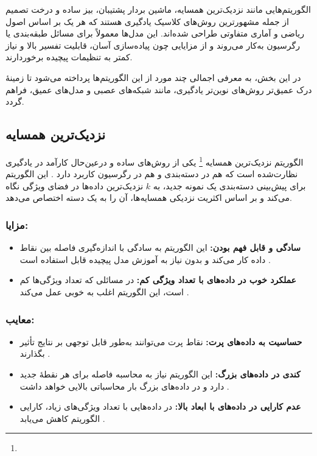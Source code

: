 الگوریتم‌هایی مانند نزدیک‌ترین همسایه، ماشین بردار پشتیبان، بیز ساده و درخت تصمیم از جمله مشهورترین روش‌های کلاسیک یادگیری هستند که هر یک بر اساس اصول ریاضی و آماری متفاوتی طراحی شده‌اند. این مدل‌ها معمولاً برای مسائل طبقه‌بندی یا رگرسیون به‌کار می‌روند و از مزایایی چون پیاده‌سازی آسان، قابلیت تفسیر بالا و نیاز کمتر به تنظیمات پیچیده برخوردارند.

در این بخش، به معرفی اجمالی چند مورد از این الگوریتم‌ها پرداخته می‌شود تا زمینهٔ درک عمیق‌تر روش‌های نوین‌تر یادگیری، مانند شبکه‌های عصبی و مدل‌های عمیق، فراهم گردد.

\subsection{نزدیک‌ترین همسایه }

الگوریتم نزدیک‌ترین همسایه \footnote{} یکی از روش‌های ساده و درعین‌حال کارآمد در یادگیری نظارت‌شده است که هم در دسته‌بندی و هم در رگرسیون کاربرد دارد
\cite{cover1967nearest,duda1973pattern,mitchell1997machine}.
این الگوریتم برای پیش‌بینی دسته‌بندی یک نمونه جدید، به $k$ نزدیک‌ترین داده‌ها در فضای ویژگی نگاه می‌کند و بر اساس اکثریت نزدیکی همسایه‌ها، آن را به یک دسته اختصاص می‌دهد. 

\subsubsection{مزایا:}
\begin{itemize}
	\item \textbf{سادگی و قابل فهم بودن:}  
	این الگوریتم به سادگی با اندازه‌گیری فاصله بین نقاط داده کار می‌کند و بدون نیاز به آموزش مدل پیچیده قابل استفاده است
	\cite{cover1967nearest}.
	\item \textbf{عملکرد خوب در داده‌های با تعداد ویژگی کم:}  
	در مسائلی که تعداد ویژگی‌ها کم است، این الگوریتم اغلب به خوبی عمل می‌کند
	\cite{james2013introduction}.
\end{itemize}

\subsubsection{معایب:}
\begin{itemize}
	\item \textbf{حساسیت به داده‌های پرت:}  
	نقاط پرت می‌توانند به‌طور قابل توجهی بر نتایج تأثیر بگذارند
	\cite{duda1973pattern}.
	\item \textbf{کندی در داده‌های بزرگ:}  
	این الگوریتم نیاز به محاسبه فاصله برای هر نقطهٔ جدید دارد و در داده‌های بزرگ بار محاسباتی بالایی خواهد داشت
	\cite{mitchell1997machine}.
	\item \textbf{عدم کارایی در داده‌های با ابعاد بالا:}  
	در داده‌هایی با تعداد ویژگی‌های زیاد، کارایی الگوریتم کاهش می‌یابد \cite{murphy2012machine}.
\end{itemize}



